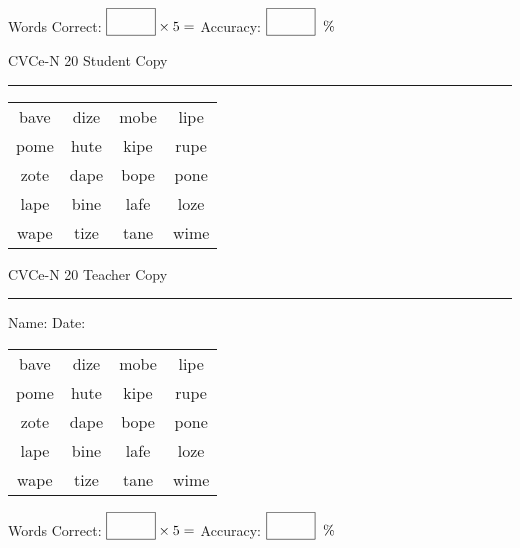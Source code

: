 \documentclass{memoir}
\begin{document}
\small

Words Correct: $\fbox{\phantom{\huge 100}} \times 5 = $ Accuracy: $\fbox{\phantom{\huge 100}}\;\; \%$ 

\vfill

\newpage



\footnotesize \noindent
CVCe-N 20 \hfill Student Copy
\smallskip
\hrule

\Large

\setlength{\tabcolsep}{14pt}
\def\arraystretch{2}

{\selectfont


\begin{vplace}[0.5]
\begin{center}
\begin{tabular}{cccc}
bave & dize & mobe & lipe \\
pome & hute & kipe & rupe \\
zote & dape & bope & pone \\
lape & bine & lafe & loze \\
wape & tize & tane & wime \\
\end{tabular}
\end{center}
\end{vplace}

}

\newpage

\footnotesize \noindent
CVCe-N 20 \hfill Teacher Copy
\smallskip
\hrule

\small

\vfill

\noindent
Name: \underline{\hspace{1.75in}} \hfill Date: \underline{\hspace{1in}}

\Large

{\selectfont


\begin{vplace}[0.5]
\begin{center}
\begin{tabular}{cccc}
bave & dize & mobe & lipe \\
pome & hute & kipe & rupe \\
zote & dape & bope & pone \\
lape & bine & lafe & loze \\
wape & tize & tane & wime \\
\end{tabular}
\end{center}
\end{vplace}



}

\small

Words Correct: $\fbox{\phantom{\huge 100}} \times 5 = $ Accuracy: $\fbox{\phantom{\huge 100}}\;\; \%$ 

\vfill

\end{document}
